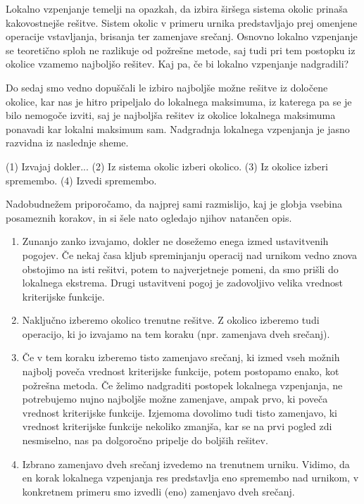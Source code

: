 \documentclass[a4paper]{article}
\begin{document}
Lokalno vzpenjanje temelji na opazkah, da izbira širšega sistema okolic prinaša kakovostnejše
rešitve. Sistem okolic v primeru urnika predstavljajo prej omenjene operacije vstavljanja,
brisanja ter zamenjave srečanj. Osnovno lokalno vzpenjanje se teoretično sploh ne razlikuje
od požrešne metode, saj tudi pri tem postopku iz okolice vzamemo najboljšo rešitev. Kaj pa,
če bi lokalno vzpenjanje nadgradili?

Do sedaj smo vedno dopuščali le izbiro najboljše možne rešitve iz določene okolice, kar nas
je hitro pripeljalo do lokalnega maksimuma, iz katerega pa se je bilo nemogoče izviti, saj
je najboljša rešitev iz okolice lokalnega maksimuma ponavadi kar lokalni maksimum sam.
Nadgradnja lokalnega vzpenjanja je jasno razvidna iz naslednje sheme.

(1) Izvajaj dokler...
{
   (2) Iz sistema okolic izberi okolico.
   (3) Iz okolice izberi spremembo.
   (4) Izvedi spremembo.
}

Nadobudnežem priporočamo, da najprej sami razmislijo, kaj je globja vsebina posameznih
korakov, in si šele nato ogledajo njihov natančen opis.


\begin{enumerate}
      \item Zunanjo zanko izvajamo, dokler ne dosežemo enega izmed ustavitvenih pogojev.
      Če nekaj časa kljub spreminjanju operacij nad urnikom vedno znova obstojimo na isti
      rešitvi, potem to najverjetneje pomeni, da smo prišli do lokalnega ekstrema. Drugi
      ustavitveni pogoj je zadovoljivo velika vrednost kriterijske funkcije.
   
      \item Naključno izberemo okolico trenutne rešitve. Z okolico izberemo tudi operacijo,
      ki jo izvajamo na tem koraku (npr. zamenjava dveh srečanj).
   
      \item Če v tem koraku izberemo tisto zamenjavo srečanj, ki izmed vseh možnih najbolj
      poveča vrednost kriterijske funkcije, potem postopamo enako, kot požrešna metoda. Če
      želimo nadgraditi postopek lokalnega vzpenjanja, ne potrebujemo nujno najboljše možne
      zamenjave, ampak prvo, ki poveča vrednost kriterijske funkcije. Izjemoma dovolimo tudi
      tisto zamenjavo, ki vrednost kriterijske funkcije nekoliko zmanjša, kar se na prvi
      pogled zdi nesmiselno, nas pa dolgoročno pripelje do boljših rešitev.
   
      \item Izbrano zamenjavo dveh srečanj izvedemo na trenutnem urniku. Vidimo, da en korak
      lokalnega vzpenjanja res predstavlja eno spremembo nad urnikom, v konkretnem primeru
      smo izvedli (eno) zamenjavo dveh srečanj.
\end{enumerate}
\end{document}
